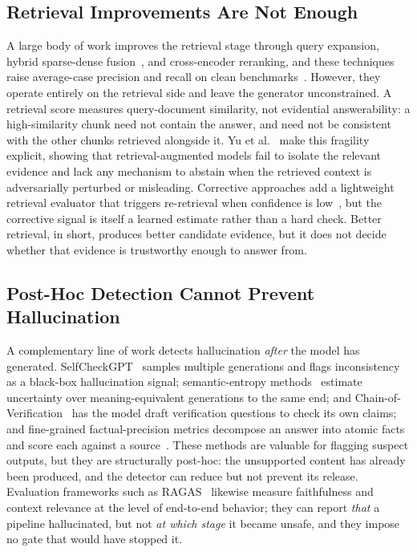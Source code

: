\documentclass[conference]{IEEEtran}
\begin{document}
\subsection{Retrieval Improvements Are Not Enough}
A large body of work improves the retrieval stage through query expansion,
hybrid sparse-dense fusion~\cite{mala2025hybrid}, and cross-encoder
reranking, and these techniques raise average-case precision and recall on
clean benchmarks~\cite{yu2024evaluation}. However, they operate entirely on
the retrieval side and leave the generator unconstrained. A retrieval score
measures query-document similarity, not evidential answerability: a
high-similarity chunk need not contain the answer, and need not be
consistent with the other chunks retrieved alongside it. Yu et
al.~\cite{yu2023reeval} make this fragility explicit, showing that
retrieval-augmented models fail to isolate the relevant evidence and lack
any mechanism to abstain when the retrieved context is adversarially
perturbed or misleading. Corrective approaches add a lightweight retrieval
evaluator that triggers re-retrieval when confidence is
low~\cite{yan2024crag}, but the corrective signal is itself a learned
estimate rather than a hard check. Better retrieval, in short, produces
better candidate evidence, but it does not decide whether that evidence is
trustworthy enough to answer from.

\subsection{Post-Hoc Detection Cannot Prevent Hallucination}
A complementary line of work detects hallucination \textit{after} the
model has generated. SelfCheckGPT~\cite{manakul2023selfcheck} samples
multiple generations and flags inconsistency as a black-box hallucination
signal; semantic-entropy methods~\cite{farquhar2024semantic} estimate
uncertainty over meaning-equivalent generations to the same end; and
Chain-of-Verification~\cite{dhuliawala2023cov} has the model draft
verification questions to check its own claims; and fine-grained
factual-precision metrics decompose an answer into atomic facts and score
each against a source~\cite{min2023factscore}. These methods are valuable
for flagging suspect outputs, but they are structurally post-hoc: the
unsupported content has already been produced, and the detector can reduce
but not prevent its release. Evaluation frameworks such as
RAGAS~\cite{es2023ragas} likewise measure faithfulness and context
relevance at the level of end-to-end behavior; they can report
\textit{that} a pipeline hallucinated, but not \textit{at which stage} it
became unsafe, and they impose no gate that would have stopped it.
\end{document}

